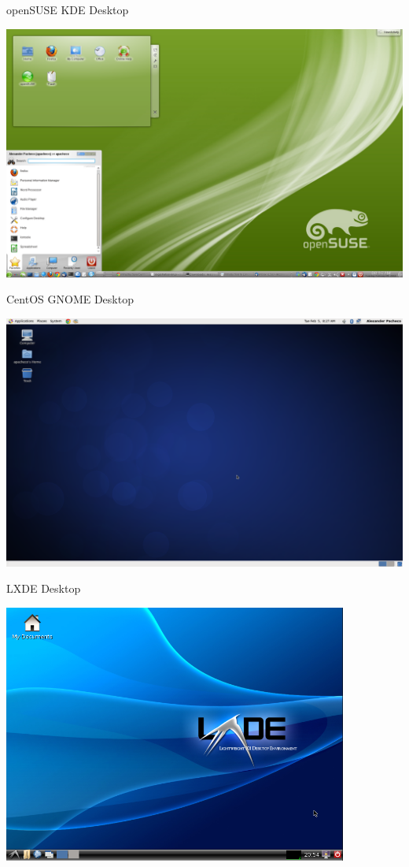 \documentclass[10pt,t]{beamer}
\begin{document}
\begin{frame}{openSUSE KDE Desktop}
  \begin{center}
    \includegraphics[width=\textwidth]{./opensuse}
  \end{center}
\end{frame}
\begin{frame}{CentOS GNOME Desktop}
  \begin{center}
    \includegraphics[width=\textwidth]{./CentOS6_3}
  \end{center}
\end{frame}
\begin{frame}{LXDE Desktop}
  \begin{center}
    \includegraphics[width=0.85\textwidth]{./LXDE_desktop_full}
  \end{center}
\end{frame}
\end{document}
